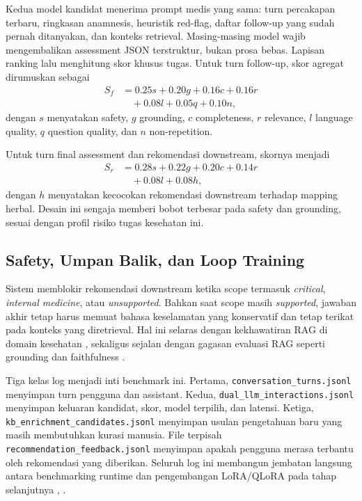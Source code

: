 \documentclass[conference]{IEEEtran}
\begin{document}
Kedua model kandidat menerima prompt medis yang sama: turn percakapan terbaru, ringkasan anamnesis, heuristik red-flag, daftar follow-up yang sudah pernah ditanyakan, dan konteks retrieval. Masing-masing model wajib mengembalikan assessment JSON terstruktur, bukan prosa bebas. Lapisan ranking lalu menghitung skor khusus tugas. Untuk turn follow-up, skor agregat dirumuskan sebagai
\begin{align}
S_f &= 0.25s + 0.20g + 0.16c + 0.16r \nonumber \\
&\quad + 0.08l + 0.05q + 0.10n,
\end{align}
dengan $s$ menyatakan safety, $g$ grounding, $c$ completeness, $r$ relevance, $l$ language quality, $q$ question quality, dan $n$ non-repetition.

Untuk turn final assessment dan rekomendasi downstream, skornya menjadi
\begin{align}
S_r &= 0.28s + 0.22g + 0.20c + 0.14r \nonumber \\
&\quad + 0.08l + 0.08h,
\end{align}
dengan $h$ menyatakan kecocokan rekomendasi downstream terhadap mapping herbal. Desain ini sengaja memberi bobot terbesar pada safety dan grounding, sesuai dengan profil risiko tugas kesehatan ini.

\subsection{Safety, Umpan Balik, dan Loop Training}
Sistem memblokir rekomendasi downstream ketika scope termasuk \emph{critical}, \emph{internal medicine}, atau \emph{unsupported}. Bahkan saat scope masih \emph{supported}, jawaban akhir tetap harus memuat bahasa keselamatan yang konservatif dan tetap terikat pada konteks yang diretrieval. Hal ini selaras dengan kekhawatiran RAG di domain kesehatan \cite{b7}, sekaligus sejalan dengan gagasan evaluasi RAG seperti grounding dan faithfulness \cite{b11}.

Tiga kelas log menjadi inti benchmark ini. Pertama, \texttt{conversation\_turns.jsonl} menyimpan turn pengguna dan assistant. Kedua, \texttt{dual\_llm\_interactions.jsonl} menyimpan keluaran kandidat, skor, model terpilih, dan latensi. Ketiga, \texttt{kb\_enrichment\_candidates.jsonl} menyimpan usulan pengetahuan baru yang masih membutuhkan kurasi manusia. File terpisah \texttt{recommendation\_feedback.jsonl} menyimpan apakah pengguna merasa terbantu oleh rekomendasi yang diberikan. Seluruh log ini membangun jembatan langsung antara benchmarking runtime dan pengembangan LoRA/QLoRA pada tahap selanjutnya \cite{b12}, \cite{b13}.
\end{document}
